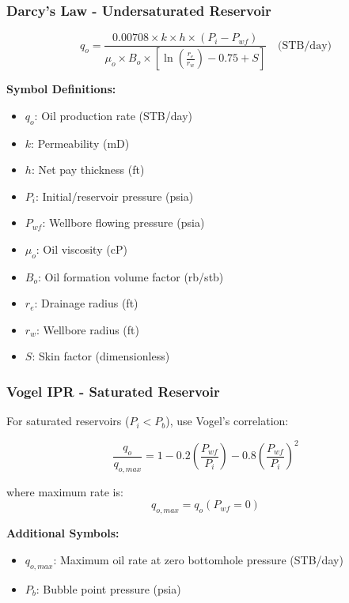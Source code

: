 \documentclass[11pt,a4paper]{article}
\newcommand{\symitem}[2]{\item \textbf{#1}: #2}
\begin{document}
\subsubsection{Darcy's Law - Undersaturated Reservoir}

\begin{tcolorbox}[colback=formulabox,colframe=black!75]
\begin{equation}
q_o = \frac{0.00708 \times k \times h \times (P_i - P_{wf})}{\mu_o \times B_o \times \left[\ln\left(\frac{r_e}{r_w}\right) - 0.75 + S\right]} \quad \text{(STB/day)}
\end{equation}
\end{tcolorbox}

\textbf{Symbol Definitions:}
\begin{itemize}[leftmargin=2cm]
\symitem{$q_o$}{Oil production rate (STB/day)}
\symitem{$k$}{Permeability (mD)}
\symitem{$h$}{Net pay thickness (ft)}
\symitem{$P_i$}{Initial/reservoir pressure (psia)}
\symitem{$P_{wf}$}{Wellbore flowing pressure (psia)}
\symitem{$\mu_o$}{Oil viscosity (cP)}
\symitem{$B_o$}{Oil formation volume factor (rb/stb)}
\symitem{$r_e$}{Drainage radius (ft)}
\symitem{$r_w$}{Wellbore radius (ft)}
\symitem{$S$}{Skin factor (dimensionless)}
\end{itemize}

\subsubsection{Vogel IPR - Saturated Reservoir}

For saturated reservoirs ($P_i < P_b$), use Vogel's correlation:

\begin{tcolorbox}[colback=formulabox,colframe=black!75]
\begin{equation}
\frac{q_o}{q_{o,max}} = 1 - 0.2 \left(\frac{P_{wf}}{P_i}\right) - 0.8 \left(\frac{P_{wf}}{P_i}\right)^2
\end{equation}

where maximum rate is:
\begin{equation}
q_{o,max} = q_o(P_{wf}=0)
\end{equation}
\end{tcolorbox}

\textbf{Additional Symbols:}
\begin{itemize}[leftmargin=2cm]
\symitem{$q_{o,max}$}{Maximum oil rate at zero bottomhole pressure (STB/day)}
\symitem{$P_b$}{Bubble point pressure (psia)}
\end{itemize}
\end{document}
